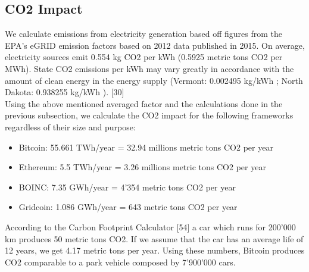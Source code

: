 \subsection{CO2 Impact}

We calculate emissions from electricity generation based off figures from the EPA’s eGRID emission factors based on 2012 data published in 2015.  On average, electricity sources emit 0.554 kg CO2 per kWh (0.5925 metric tons CO2 per MWh). State CO2 emissions per kWh may vary greatly in accordance with the amount of clean energy in the energy supply (Vermont: 0.002495 kg/kWh ; North Dakota: 0.938255 kg/kWh ). [30]\\

Using the above mentioned averaged factor and the calculations done in the previous subsection, we calculate the CO2 impact for the following frameworks regardless of their size and purpose:

\begin{itemize}
  \item Bitcoin: 55.661 TWh/year = 32.94 millions metric tons CO2 per year
  \item Ethereum: 5.5 TWh/year = 3.26 millions metric tons CO2 per year
  \item BOINC: 7.35 GWh/year = 4'354 metric tons CO2 per year
  \item Gridcoin: 1.086 GWh/year =  643 metric tons CO2 per year
\end{itemize}

According to the Carbon Footprint Calculator [54] a car which runs for 200'000 km produces 50 metric tons CO2. If we assume that the car has an average life of 12 years, we get 4.17 metric tons per year. Using these numbers, Bitcoin produces CO2 comparable to a park vehicle composed by 7'900'000 cars. 


 
